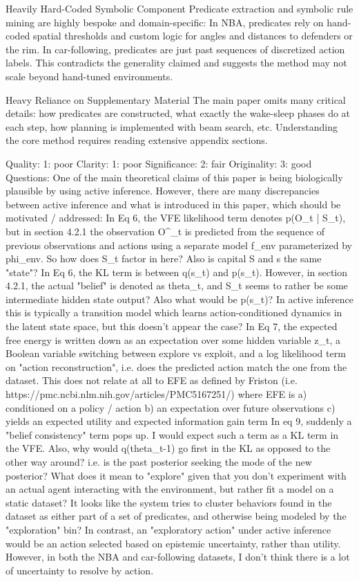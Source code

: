 Heavily Hard-Coded Symbolic Component Predicate extraction and symbolic rule mining are highly bespoke and domain-specific: In NBA, predicates rely on hand-coded spatial thresholds and custom logic for angles and distances to defenders or the rim. In car-following, predicates are just past sequences of discretized action labels. This contradicts the generality claimed and suggests the method may not scale beyond hand-tuned environments.

Heavy Reliance on Supplementary Material The main paper omits many critical details: how predicates are constructed, what exactly the wake-sleep phases do at each step, how planning is implemented with beam search, etc. Understanding the core method requires reading extensive appendix sections.

Quality: 1: poor
Clarity: 1: poor
Significance: 2: fair
Originality: 3: good
Questions:
One of the main theoretical claims of this paper is being biologically plausible by using active inference. However, there are many discrepancies between active inference and what is introduced in this paper, which should be motivated / addressed:
In Eq 6, the VFE likelihood term denotes p(O_t | S_t), but in section 4.2.1 the observation O^_t is predicted from the sequence of previous observations and actions using a separate model f_env parameterized by phi_env. So how does S_t factor in here? Also is capital S and s the same "state"?
In Eq 6, the KL term is between q(s_t) and p(s_t). However, in section 4.2.1, the actual "belief" is denoted as theta_t, and S_t seems to rather be some intermediate hidden state output? Also what would be p(s_t)? In active inference this is typically a transition model which learns action-conditioned dynamics in the latent state space, but this doesn't appear the case?
In Eq 7, the expected free energy is written down as an expectation over some hidden variable z_t, a Boolean variable switching between explore vs exploit, and a log likelihood term on "action reconstruction", i.e. does the predicted action match the one from the dataset. This does not relate at all to EFE as defined by Friston (i.e. https://pmc.ncbi.nlm.nih.gov/articles/PMC5167251/) where EFE is a) conditioned on a policy / action b) an expectation over future observations c) yields an expected utility and expected information gain term
In eq 9, suddenly a "belief consistency" term pops up. I would expect such a term as a KL term in the VFE. Also, why would q(theta_{t-1}) go first in the KL as opposed to the other way around? i.e. is the past posterior seeking the mode of the new posterior?
What does it mean to "explore" given that you don't experiment with an actual agent interacting with the environment, but rather fit a model on a static dataset? It looks like the system tries to cluster behaviors found in the dataset as either part of a set of predicates, and otherwise being modeled by the "exploration" bin? In contrast, an "exploratory action" under active inference would be an action selected based on epistemic uncertainty, rather than utility. However, in both the NBA and car-following datasets, I don't think there is a lot of uncertainty to resolve by action.

